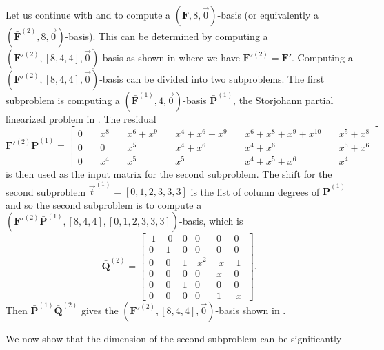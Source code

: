 \begin{exmp}
\label{exm:subproblems} Let us continue with 
and  to compute a $\left(\mathbf{F},8,\vec{0}\right)$-basis
(or equivalently a $(\bar{\mathbf{F}}^{\left(2\right)},8,\vec{0})$-basis).
This can be determined by computing a $(\mathbf{F}'^{\left(2\right)},[8,4,4],\vec{0})$-basis
as shown in  where we have $\mathbf{F}'^{\left(2\right)}=\mathbf{F}'$.
Computing a $(\mathbf{F}'^{\left(2\right)},[8,4,4],\vec{0})$-basis
can be divided into two subproblems. The first subproblem is computing
a $(\bar{\mathbf{F}}^{\left(1\right)},4,\vec{0})$-basis $\bar{\mathbf{P}}^{\left(1\right)}$,
the Storjohann partial linearized problem in .
The residual \[
\mathbf{F}'^{(2)}\bar{\mathbf{P}}^{(1)}=\left[{\begin{array}{rcccccccccc}
0 & \  & x^{8} & \  & x^{6}+x^{9} & \  & x^{4}+x^{6}+x^{9} & \  & x^{6}+x^{8}+x^{9}+x^{10} & \  & x^{5}+x^{8}\\
0 &  & 0 &  & x^{5} &  & x^{4}+x^{6} &  & x^{4}+x^{6} &  & x^{5}+x^{6}\\
0 &  & x^{4} &  & x^{5} &  & x^{5} &  & x^{4}+x^{5}+x^{6} &  & x^{4}\end{array}}\right]\]
 is then used as the input matrix for the second subproblem. The shift
for the second subproblem $\vec{t}^{(1)}=[0,1,2,3,3,3]$ is the list
of column degrees of $\bar{\mathbf{P}}^{(1)}$ and so the second subproblem
is to compute a $(\mathbf{F}'^{(2)}\bar{\mathbf{P}}^{(1)},\left[8,4,4\right],[0,1,2,3,3,3])$-basis,
which is \begin{equation}
\bar{\mathbf{Q}}^{(2)}=\left[{\begin{array}{cccccc}
~1~ & ~0~ & 0 & 0 & 0 & 0\\
0 & 1 & 0 & 0 & 0 & 0\\
0 & 0 & 1 & ~x^{2}~ & ~x~ & ~1~\\
0 & 0 & 0 & 0 & x & 0\\
0 & 0 & 1 & 0 & 0 & 0\\
0 & 0 & 0 & 0 & 1 & ~x~\end{array}}\right].\label{eq:Qbar2}\end{equation}
Then $\bar{\mathbf{P}}^{(1)}\bar{\mathbf{Q}}^{(2)}$ gives the $(\mathbf{F}'^{\left(2\right)},[8,4,4],\vec{0})$-basis
shown in . 
\end{exmp}
We now show that the dimension of the second subproblem can be significantly
